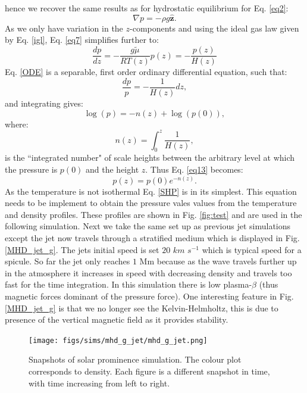 \documentclass[12pt,a4paper,twoside]{article}
\begin{document}
hence we recover the same results as for hydrostatic equilibrium for Eq. \eqref{eq2}:
\begin{equation} \label{eq7}
\nabla p = - \rho g \boldsymbol{\hat{z}} .
\end{equation}
As we only have variation in the $z$-components and using the ideal gas law given by Eq. \eqref{igl}, Eq. \eqref{eq7} simplifies further to:
\begin{equation} \label{ODE} 
\frac{d p}{dz} = -\frac{g \widetilde{\mu}}{R T(z)} p(z) = -\frac{p(z)}{H(z)} 
\end{equation} 
Eq. \eqref{ODE} is a separable, first order ordinary differential equation, such that:
\begin{equation}
\frac{d p }{p} = -\frac{1}{H(z)} dz,
\end{equation}
and integrating gives:
\begin{equation}\label{eq13}
\log (p) = -n(z) + \log (p(0)),
\end{equation}
where:
\begin{equation}
n(z) = \int^{z}_{0} \frac{1}{H(z)},
\end{equation}
is the ``integrated number" of scale heights between the arbitrary level at which the pressure is $p(0)$ and the height $z$. Thus Eq. \eqref{eq13} becomes:
\begin{equation}\label{SHP}
p(z) = p(0) e^{-n(z)}.
\end{equation}
As the temperature is not isothermal Eq. \eqref{SHP} is in its simplest. This equation needs to be implement to obtain the pressure vales values from the temperature and density profiles. These profiles are shown in Fig. \eqref{fig:test} and are used in the following simulation. Next we take the same set up as previous jet simulations except the jet now travels through a stratified medium which is displayed in Fig. \eqref{MHD_jet_g}. The jets initial speed is set $20$ $km$ $s^{-1}$ which is typical speed for a spicule. So far the jet only reaches $1$ Mm because as the wave travels further up in the atmosphere it increases in speed with decreasing density and travels too fast for the time integration. In this simulation there is low plasma-$\beta$ (thus magnetic forces dominant of the pressure force). One interesting feature in Fig. \eqref{MHD_jet_g} is that we no longer see the Kelvin-Helmholtz, this is due to presence of the vertical magnetic field as it provides stability. \\
\begin{figure}[!]
 \centering
 \texttt{[image: figs/sims/mhd\_g\_jet/mhd\_g\_jet.png]}
 \caption{Snapshots of solar prominence simulation. The colour plot corresponds to density. Each figure is a different snapshot in time, with time increasing from left to right.}
  \label{MHD_jet_g}
\end{figure}  \\ \\
\end{document}
